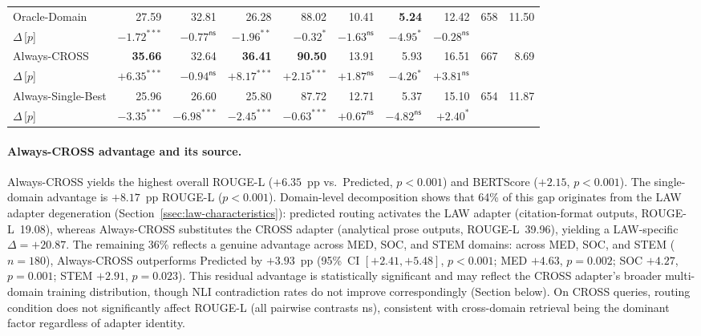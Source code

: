 \documentclass[a4paper,fleql,doubleblind]{cas-sc}
\begin{document}
\begin{center}
\begin{tabular}{l|rrr|r|rrr|rr}
Oracle-Domain
 & 27.59 & 32.81 & 26.28 & 88.02
 & 10.41 & \textbf{5.24} & 12.42 & 658 & 11.50 \\
\quad$\Delta$\,[$p$]
 & $-1.72^{***}$ & $-0.77^{\mathsf{ns}}$ & $-1.96^{**}$ & $-0.32^{*}$
 & $-1.63^{\mathsf{ns}}$ & $-4.95^{*}$ & $-0.28^{\mathsf{ns}}$ & & \\
Always-CROSS
 & \textbf{35.66} & 32.64 & \textbf{36.41} & \textbf{90.50}
 & 13.91 & 5.93 & 16.51 & 667 & 8.69 \\
\quad$\Delta$\,[$p$]
 & $+6.35^{***}$ & $-0.94^{\mathsf{ns}}$ & $+8.17^{***}$ & $+2.15^{***}$
 & $+1.87^{\mathsf{ns}}$ & $-4.26^{*}$ & $+3.81^{\mathsf{ns}}$ & & \\
Always-Single-Best
 & 25.96 & 26.60 & 25.80 & 87.72
 & 12.71 & 5.37 & 15.10 & 654 & 11.87 \\
\quad$\Delta$\,[$p$]
 & $-3.35^{***}$ & $-6.98^{***}$ & $-2.45^{***}$ & $-0.63^{***}$
 & $+0.67^{\mathsf{ns}}$ & $-4.82^{\mathsf{ns}}$ & $+2.40^{*}$ & & \\
\bottomrule
\end{tabular}
\endgroup
\end{center}
\vspace{4pt plus 3pt minus 2pt}

\paragraph{Always-CROSS advantage and its source.}
Always-CROSS yields the highest overall ROUGE-L ($+6.35$~pp vs.\ Predicted,
$p{<}0.001$) and BERTScore ($+2.15$, $p{<}0.001$).
The single-domain advantage is $+8.17$~pp ROUGE-L ($p{<}0.001$).
Domain-level decomposition shows that 64\% of this gap originates from the
LAW adapter degeneration (Section~\ref{ssec:law-characteristics}): predicted routing
activates the LAW adapter (citation-format outputs, ROUGE-L~19.08), whereas
Always-CROSS substitutes the CROSS adapter (analytical prose outputs, ROUGE-L~39.96),
yielding a LAW-specific $\Delta{=}{+}20.87$.
The remaining 36\% reflects a genuine advantage across MED, SOC, and STEM domains:
across MED, SOC, and STEM ($n{=}180$), Always-CROSS outperforms Predicted by
$+3.93$~pp (95\%~CI $[{+}2.41,{+}5.48]$, $p{<}0.001$; MED $+4.63$, $p{=}0.002$;
SOC $+4.27$, $p{=}0.001$; STEM $+2.91$, $p{=}0.023$).
This residual advantage is statistically significant and may reflect the CROSS
adapter's broader multi-domain training distribution, though NLI contradiction rates
do not improve correspondingly (Section below).
On CROSS queries, routing condition does not significantly affect ROUGE-L
(all pairwise contrasts \textsf{ns}), consistent with cross-domain retrieval
being the dominant factor regardless of adapter identity.
\end{document}
